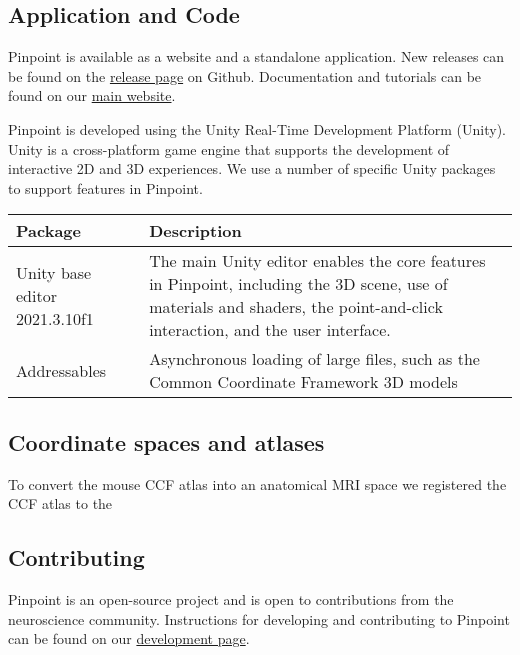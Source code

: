\subsection{Application and Code}

Pinpoint is available as a website and a standalone application. New releases can be found on the \href{https://github.com/VirtualBrainLab/Pinpoint/releases}{release page} on Github. Documentation and tutorials can be found on our \href{https://virtualbrainlab.org/02_traj_planner/01_tp_intro.html}{main website}. 

Pinpoint is developed using the Unity Real-Time Development Platform (Unity). Unity is a cross-platform game engine that supports the development of interactive 2D and 3D experiences. We use a number of specific Unity packages to support features in Pinpoint.

\begin{center}
\begin{tabular}{ |p{3cm}|p{8cm}| }
\hline
 Package & Description \\ 
 \hline
 Unity base editor 2021.3.10f1 & The main Unity editor enables the core features in Pinpoint, including the 3D scene, use of materials and shaders, the point-and-click interaction, and the user interface. \\ 
 \hline
 Addressables & Asynchronous loading of large files, such as the Common Coordinate Framework 3D models \\
 \hline
\end{tabular}
\end{center}

\subsection{Coordinate spaces and atlases}

To convert the mouse CCF \citep{wang2020allen} atlas into an anatomical MRI space we registered the CCF atlas to the 

\subsection{Contributing}

Pinpoint is an open-source project and is open to contributions from the neuroscience community. Instructions for developing and contributing to Pinpoint can be found on our \href{https://virtualbrainlab.org/02_traj_planner/05_tp_development.html}{development page}.
